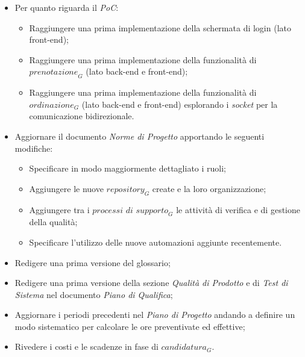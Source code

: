 \begin{itemize}
    \item Per quanto riguarda il \emph{PoC}:
    \begin{itemize}
        \item Raggiungere una prima implementazione della schermata di login (lato front-end);
        \item Raggiungere una prima implementazione della funzionalità di $\textit{prenotazione}_G$ (lato back-end e front-end);
        \item Raggiungere una prima implementazione della funzionalità di $\textit{ordinazione}_G$ (lato back-end e front-end) esplorando i \emph{socket} per la comunicazione bidirezionale.
    \end{itemize}
    \item Aggiornare il documento \emph{Norme di Progetto} apportando le seguenti modifiche:
    \begin{itemize}
        \item Specificare in modo maggiormente dettagliato i ruoli;
        \item Aggiungere le nuove $\textit{repository}_G$ create e la loro organizzazione;
        \item Aggiungere tra i $\textit{processi di supporto}_G$ le attività di verifica e di gestione della qualità;
        \item Specificare l'utilizzo delle nuove automazioni aggiunte recentemente.
    \end{itemize}
    \item Redigere una prima versione del glossario;
    \item Redigere una prima versione della sezione \emph{Qualità di Prodotto} e di \emph{Test di Sistema} nel documento \emph{Piano di Qualifica};
    \item Aggiornare i periodi precedenti nel \emph{Piano di Progetto} andando a definire un modo sistematico per calcolare le ore preventivate ed effettive;
    \item Rivedere i costi e le scadenze in fase di $\textit{candidatura}_G$.
\end{itemize}
